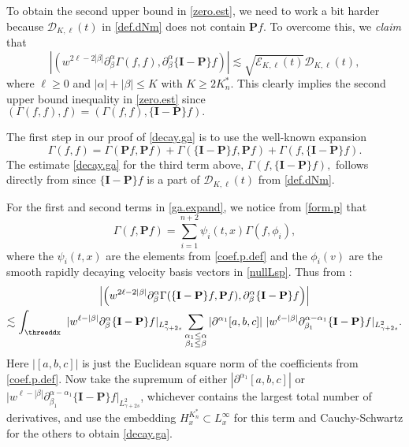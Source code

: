 \documentclass{amsart}
\numberwithin{equation}{section}
\begin{document}
To obtain the second upper bound in \eqref{zero.est}, we need to work a bit harder because ${\mathcal{D}}_{{K}, {\ell}}(t)$ in \eqref{def.dNm} does not contain ${\mathbf{P}} {f}$.  To overcome this, we {\it claim} that
\begin{equation}
\label{decay.ga}
 \left| \left(  w^{2{\ell}-2|\beta|}\partial^\alpha_\beta {\Gamma}({f},{f}), \partial^\alpha_\beta \{{\mathbf{I}}-{\mathbf{P}}\}{f}\right) \right| 
 \lesssim 
\sqrt{{\mathcal{E}}_{{K},{\ell}}(t)} {\mathcal{D}}_{{K},{\ell}}(t),
\end{equation}
where $\ell \ge 0$ and $|{\alpha}| + |{\beta}| \le {K}$ with ${{K \ge 2{K^*_n}}}$.  This clearly implies the second upper bound inequality in \eqref{zero.est} since
$
\left(  {\Gamma}(f,f),  f \right)
=
\left(  {\Gamma}(f,f),  \{{\mathbf{I}}-{\mathbf{P}}\}{f} \right).
$

The first step in our proof of \eqref{decay.ga} is to use the well-known expansion
\begin{equation}
\label{ga.expand}
{\Gamma}({f},{f}) =
\Gamma ({\mathbf{P}} {f}, {\mathbf{P}} {f})
+
{\Gamma} (\{{\mathbf{I}}-{\mathbf{P}}\}{f}, {\mathbf{P}} {f})
+
{\Gamma} ({f}, \{{\mathbf{I}}-{\mathbf{P}}\}{f}).
\end{equation}
The estimate \eqref{decay.ga} for the third term above, 
$
{\Gamma} ({f}, \{{\mathbf{I}}-{\mathbf{P}}\}{f}),
$
follows directly from \cite[Lemmas 2.2 and 2.3]{gsNonCut0} since 
$\{{\mathbf{I}}-{\mathbf{P}}\}{f}$ is a part of ${\mathcal{D}}_{{K},{\ell}}(t)$ from \eqref{def.dNm}.

For the first and second terms in \eqref{ga.expand}, we notice from \eqref{form.p} that
$$
{\Gamma} ({f}, {\mathbf{P}} {f})= \sum_{i=1}^{{n} +2} \psi_i(t,x) {\Gamma} ({f}, \phi_i),
$$
where the $\psi_i(t,x)$ are the elements from \eqref{coef.p.def} and the $\phi_i(v)$ are the smooth rapidly decaying velocity basis vectors in \eqref{nullLsp}.  Thus from \cite[Proposition 6.1]{gsNonCut0}:
\begin{multline}\notag
\left| \left(  w^{2{\ell}-2|\beta|}\partial^\alpha_\beta \Gamma (\{{\mathbf{I}}-{\mathbf{P}}\} {f}, {\mathbf{P}} {f}), \partial^\alpha_\beta \{{\mathbf{I}}-{\mathbf{P}}\}{f} \right) \right|
\\
\lesssim
\int_\threeddx ~ 
{|} w^{{\ell}-|\beta|} \partial^\alpha_\beta \{{\mathbf{I}}-{\mathbf{P}}\}{f}{|}_{L^2_{\gamma+2s}}
\sum_{\substack{{\alpha}_1 \le {\alpha} \\ {\beta}_1 \le {\beta}}}
|{\partial}^{{\alpha}_1} [a,b,c]| ~
  {|} w^{{\ell}-|\beta|} \partial^{{\alpha}-{{\alpha}_1}}_{{\beta}_1} \{{\mathbf{I}}-{\mathbf{P}}\} {f}{|}_{L^2_{\gamma+2s}}.
\end{multline}
 Here $|[a,b,c]|$ is just the Euclidean square norm of the coefficients from \eqref{coef.p.def}.  Now take the supremum of either $|{\partial}^{{\alpha}_1} [a,b,c]|$ or ${|} w^{{\ell}-|\beta|} \partial^{{\alpha}-{{\alpha}_1}}_{{\beta}_1} \{{\mathbf{I}}-{\mathbf{P}}\} {f}{|}_{L^2_{\gamma+2s}}$, whichever contains the largest total number of derivatives, and use the embedding $H^{K^*_n}_x \subset L^\infty_x$ for this term and Cauchy-Schwartz for the others to obtain \eqref{decay.ga}.
 
\end{document}
